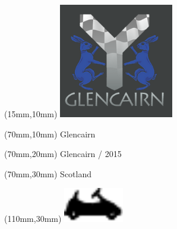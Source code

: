 \null\newpage
\begin{textblock*}{50mm}(15mm,10mm)%
\includegraphics[width=50mm]{LG/GLCN.png}
\end{textblock*}
\begin{textblock*}{130mm}(70mm,10mm)%
{\fontsize{20}{20}\selectfont Glencairn}\\
\end{textblock*}
\begin{textblock*}{120mm}(70mm,20mm)%
{\fontsize{16}{16}\selectfont Glencairn / 2015}\\
\end{textblock*}
\begin{textblock*}{120mm}(70mm,30mm)%
{\fontsize{12}{12}\selectfont Scotland}
\end{textblock*}
\begin{textblock*}{30mm}(110mm,30mm)%
\centering
\includegraphics[height=15mm]{icons/kart.pdf}
\end{textblock*}
